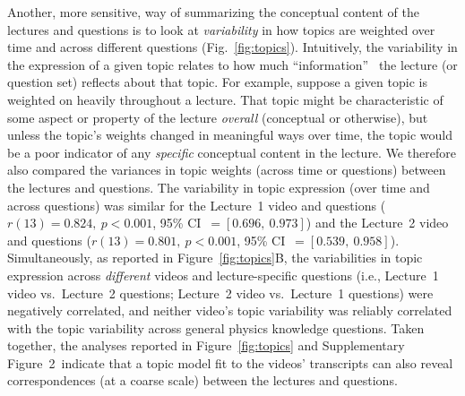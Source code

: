 \documentclass[10pt]{article}
\newcommand{\topicWeights}{2}
\begin{document}
Another, more sensitive, way of summarizing the conceptual content of the
lectures and questions is to look at \textit{variability} in how topics are
weighted over time and across different questions (Fig.~\ref{fig:topics}).
Intuitively, the variability in the expression of a given topic relates to how
much ``information''~\citep{Fish22} the lecture (or question set) reflects
about that topic. For example, suppose a given topic is weighted on heavily
throughout a lecture. That topic might be characteristic of some aspect or
property of the lecture \textit{overall} (conceptual or otherwise), but unless
the topic's weights changed in meaningful ways over time, the topic would be a
poor indicator of any \textit{specific} conceptual content in the lecture. We
therefore also compared the variances in topic weights (across time or
questions) between the lectures and questions. The variability in topic
expression (over time and across questions) was similar for the Lecture~1 video
and questions ($r(13) = 0.824,~p<0.001$, 95\% CI~$= [0.696,~0.973]$) and the
Lecture~2 video and questions ($r(13) = 0.801,~p<0.001$, 95\% CI~$=
[0.539,~0.958]$). Simultaneously, as reported in Figure~\ref{fig:topics}B, the
variabilities in topic expression across \textit{different} videos and
lecture-specific questions (i.e., Lecture~1 video vs.~Lecture~2 questions;
Lecture~2 video vs.~Lecture~1 questions) were negatively correlated, and
neither video's topic variability was reliably correlated with the topic
variability across general physics knowledge questions. Taken together, the
analyses reported in Figure~\ref{fig:topics} and Supplementary
Figure~\topicWeights~indicate that a topic model fit to the videos' transcripts
can also reveal correspondences (at a coarse scale) between the lectures and
questions.
\end{document}

